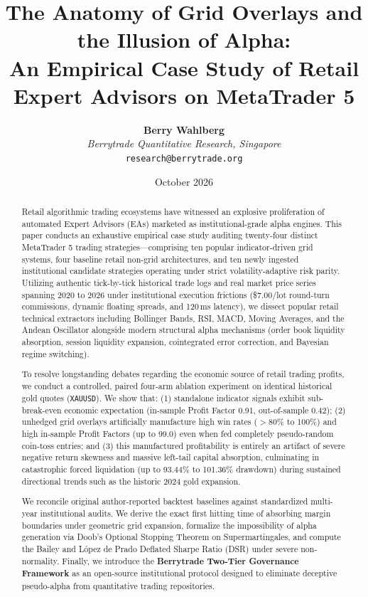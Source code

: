 \documentclass[11pt,a4paper]{article}
\title{\textbf{The Anatomy of Grid Overlays and the Illusion of Alpha: \\ An Empirical Case Study of Retail Expert Advisors on MetaTrader 5}}
\author{
    \textbf{Berry Wahlberg} \\
    \textit{Berrytrade Quantitative Research, Singapore} \\
    \texttt{research@berrytrade.org}
}
\date{October 2026}
\begin{document}
\maketitle

\begin{abstract}
Retail algorithmic trading ecosystems have witnessed an explosive proliferation of automated Expert Advisors (EAs) marketed as institutional-grade alpha engines. This paper conducts an exhaustive empirical case study auditing twenty-four distinct MetaTrader 5 trading strategies---comprising ten popular indicator-driven grid systems, four baseline retail non-grid architectures, and ten newly ingested institutional candidate strategies operating under strict volatility-adaptive risk parity. Utilizing authentic tick-by-tick historical trade logs and real market price series spanning 2020 to 2026 under institutional execution frictions (\$7.00/lot round-turn commissions, dynamic floating spreads, and 120\,ms latency), we dissect popular retail technical extractors including Bollinger Bands, RSI, MACD, Moving Averages, and the Andean Oscillator alongside modern structural alpha mechanisms (order book liquidity absorption, session liquidity expansion, cointegrated error correction, and Bayesian regime switching).

To resolve longstanding debates regarding the economic source of retail trading profits, we conduct a controlled, paired four-arm ablation experiment on identical historical gold quotes (\texttt{XAUUSD}). We show that: (1) standalone indicator signals exhibit sub-break-even economic expectation (in-sample Profit Factor 0.91, out-of-sample 0.42); (2) unhedged grid overlays artificially manufacture high win rates ($>$80\% to 100\%) and high in-sample Profit Factors (up to 99.0) even when fed completely pseudo-random coin-toss entries; and (3) this manufactured profitability is entirely an artifact of severe negative return skewness and massive left-tail capital absorption, culminating in catastrophic forced liquidation (up to 93.44\% to 101.36\% drawdown) during sustained directional trends such as the historic 2024 gold expansion. 

We reconcile original author-reported backtest baselines against standardized multi-year institutional audits. We derive the exact first hitting time of absorbing margin boundaries under geometric grid expansion, formalize the impossibility of alpha generation via Doob's Optional Stopping Theorem on Supermartingales, and compute the Bailey and L{\'o}pez de Prado Deflated Sharpe Ratio (DSR) under severe non-normality. Finally, we introduce the \textbf{Berrytrade Two-Tier Governance Framework} as an open-source institutional protocol designed to eliminate deceptive pseudo-alpha from quantitative trading repositories.
\end{abstract}
\end{document}
